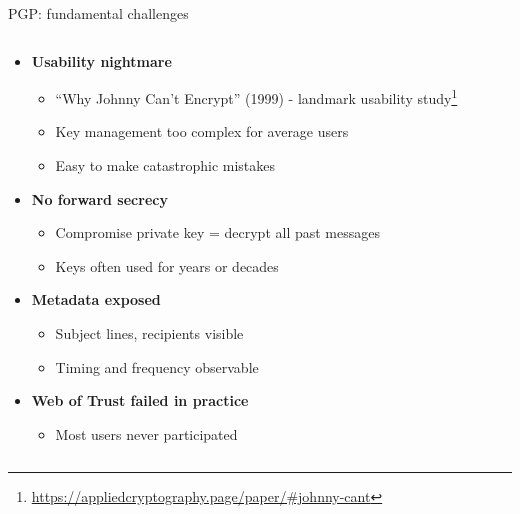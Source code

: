 \documentclass[aspectratio=169, lualatex, handout]{beamer}
\begin{document}
\begin{frame}{PGP: fundamental challenges}
	\begin{columns}[c]
		\begin{column}{1\textwidth}
			\begin{itemize}
				\item \textbf{Usability nightmare}
				      \begin{itemize}
					      \item ``Why Johnny Can't Encrypt'' (1999) - landmark usability study\footnote{\url{https://appliedcryptography.page/paper/\#johnny-cant}}
					      \item Key management too complex for average users
					      \item Easy to make catastrophic mistakes
				      \end{itemize}
				\item \textbf{No forward secrecy}
				      \begin{itemize}
					      \item Compromise private key = decrypt all past messages
					      \item Keys often used for years or decades
				      \end{itemize}
				\item \textbf{Metadata exposed}
				      \begin{itemize}
					      \item Subject lines, recipients visible
					      \item Timing and frequency observable
				      \end{itemize}
				\item \textbf{Web of Trust failed in practice}
				      \begin{itemize}
					      \item Most users never participated
				      \end{itemize}
			\end{itemize}
		\end{column}
	\end{columns}
\end{frame}
\end{document}
